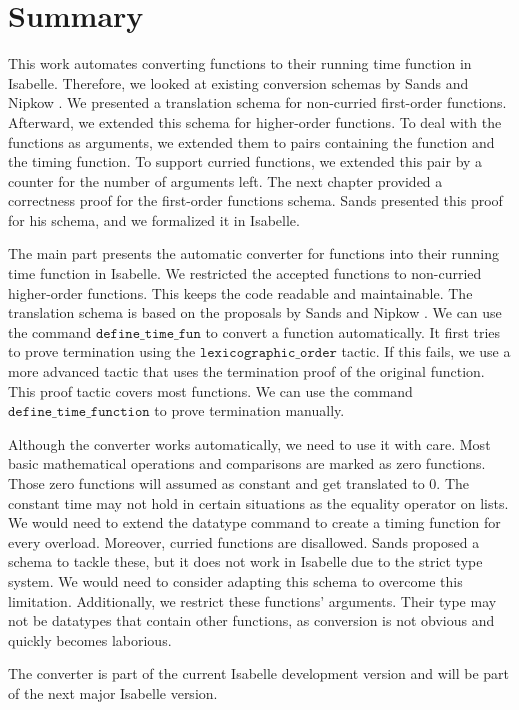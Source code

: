 
\chapter{Summary}\label{chapter:summary}
This work automates converting functions to their running time function in Isabelle.
Therefore, we looked at existing conversion schemas by Sands \parencite{sands} and Nipkow \parencite{fds}.
We presented a translation schema for non-curried first-order functions.
Afterward, we extended this schema for higher-order functions.
To deal with the functions as arguments, we extended them to pairs containing the function and the timing function.
To support curried functions, we extended this pair by a counter for the number of arguments left.
The next chapter provided a correctness proof for the first-order functions schema.
Sands presented this proof for his schema, and we formalized it in Isabelle.

The main part presents the automatic converter for functions into their running time function in Isabelle.
We restricted the accepted functions to non-curried higher-order functions.
This keeps the code readable and maintainable.
The translation schema is based on the proposals by Sands \parencite{sands} and Nipkow \parencite{fds}.
We can use the command $\texttt{define\_time\_fun}$ to convert a function automatically.
It first tries to prove termination using the $\texttt{lexicographic\_order}$ tactic.
If this fails, we use a more advanced tactic that uses the termination proof of the original function.
This proof tactic covers most functions.
We can use the command $\texttt{define\_time\_function}$ to prove termination manually.

Although the converter works automatically, we need to use it with care.
Most basic mathematical operations and comparisons are marked as zero functions.
Those zero functions will assumed as constant and get translated to $0$.
The constant time may not hold in certain situations as the equality operator on lists.
We would need to extend the datatype command to create a timing function for every overload.
Moreover, curried functions are disallowed.
Sands proposed a schema to tackle these, but it does not work in Isabelle due to the strict type system.
We would need to consider adapting this schema to overcome this limitation.
Additionally, we restrict these functions' arguments.
Their type may not be datatypes that contain other functions, as conversion is not obvious and quickly becomes laborious.

The converter is part of the current Isabelle development version and will be part of the next major Isabelle version.
